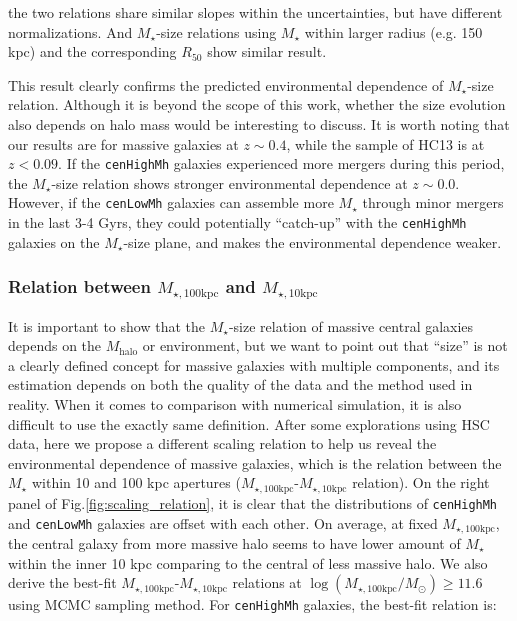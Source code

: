 \documentclass{emulateapj}
\def\rbcg{\texttt{cenHighMh}}
\def\nbcg{\texttt{cenLowMh}}
\def\mstar{{$M_{\star}$}}
\def\mhalo{{$M_{\mathrm{halo}}$}}
\def\minn{{$M_{\star,10\mathrm{kpc}}$}}
\def\mtot{{$M_{\star,100\mathrm{kpc}}$}}
\def\logmtot{{$\log (M_{\star,100\mathrm{kpc}}/M_{\odot})$}}
\newcommand{\update}[1]{\textcolor{Bittersweet}{#1}}
\begin{document}
\begin{CJK*}{UTF8}{gbsn}
    \noindent 
    \update{
    the two relations share similar slopes within the uncertainties, but have 
    different normalizations. 
    And \mstar{}-size relations using \mstar{} within larger radius (e.g. 150 kpc) and the 
    corresponding $R_{\mathrm{50}}$ show similar result.
    }

    \update{
    This result clearly confirms the predicted environmental dependence of 
    \mstar{}-size relation. 
    Although it is beyond the scope of this work, whether the size evolution also 
    depends on halo mass would be interesting to discuss. 
    It is worth noting that our results are for massive galaxies at $z\sim 0.4$, 
    while the sample of HC13 is at $z<0.09$. 
    If the \rbcg{} galaxies experienced more mergers during this period, the 
    \mstar{}-size relation shows stronger environmental dependence at $z\sim 0.0$. 
    However, if the \nbcg{} galaxies can assemble more \mstar{} through
    minor mergers in the last 3-4 Gyrs, they could potentially ``catch-up'' with the 
    \rbcg{} galaxies on the \mstar{}-size plane, and makes the environmental 
    dependence weaker.
    }
    

\subsubsection{Relation between \mtot{} and \minn{}}
    \label{sssec:m100_m10}
    
    \update{
    It is important to show that the \mstar{}-size relation of massive central galaxies 
    depends on the \mhalo{} or environment, but we want to point out that ``size'' is not 
    a clearly defined concept for massive galaxies with multiple components, and its 
    estimation depends on both the quality of the data and the method used in reality. 
    When it comes to comparison with numerical simulation, it is also difficult to use the
    exactly same definition.  
    After some explorations using HSC data, here we propose a different scaling relation 
    to help us reveal the environmental dependence of massive galaxies, which is the 
    relation between the \mstar{} within 10 and 100 kpc apertures 
    (\mtot{}-\minn{} relation). 
    On the right panel of Fig.\ref{fig:scaling_relation}, it is clear that the 
    distributions of \rbcg{} and \nbcg{} galaxies are offset with each other. 
    On average, at fixed \mtot{}, the central galaxy from more massive halo seems to 
    have lower amount of \mstar{} within the inner 10 kpc comparing to the central of 
    less massive halo.
    }
    We also derive the best-fit \mtot{}-\minn{} relations at \logmtot$\geq 11.6$ using 
    MCMC sampling method.  
    For \rbcg{} galaxies, the best-fit relation is:
    

\end{CJK*}
\end{document}
